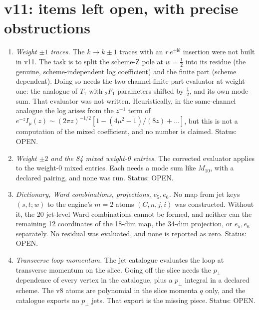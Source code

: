 \documentclass[11pt,a4paper]{article}
\newcommand{\ii}{\mathrm i}
\newcommand{\OPEN}{\textsf{OPEN}}
\theoremstyle{plain}
\theoremstyle{definition}
\theoremstyle{remark}
\numberwithin{equation}{section}
\begin{document}
\section{v11: items left open, with precise obstructions}
\label{sec:v11open}

\begin{enumerate}[label=(\alph*)]
\item \emph{Weight \(\pm1\) traces.} The \(k\to k\pm1\) traces with an
\(r\,e^{\pm\ii\theta}\) insertion were not built in v11. The task is
to split the scheme-Z pole at \(w=\tfrac12\) into its residue (the
genuine, scheme-independent log coefficient) and the finite part
(scheme dependent). Doing so needs the two-channel finite-part
evaluator at weight one: the analogue of \(T_1\) with
\({}_2F_1\) parameters shifted by \(\tfrac12\), and its own mode sum.
That evaluator was not written. Heuristically, in the same-channel
analogue the log arises from the \(z^{-1}\) term of
\(e^{-z}I_\mu(z)\sim(2\pi z)^{-1/2}[1-(4\mu^2-1)/(8z)+\dots]\), but
this is not a computation of the mixed coefficient, and no number is
claimed. Status: \OPEN.
\item \emph{Weight \(\pm2\) and the 84 mixed weight-0 entries.} The
corrected evaluator applies to the weight-0 mixed entries. Each
needs a mode sum like \(M_{10}\), with a declared pairing, and none
was run. Status: \OPEN.
\item \emph{Dictionary, Ward combinations, projections, \(e_5,e_6\).}
No map from jet keys \((s,t;w)\) to the engine's \(m=2\) atoms
\((C,n,j,i)\) was constructed. Without it, the 20 jet-level Ward
combinations cannot be formed, and neither can the remaining 12
coordinates of the 18-dim map, the 34-dim projection, or \(e_5,e_6\)
separately. No residual was evaluated, and none is reported as zero.
Status: \OPEN.
\item \emph{Transverse loop momentum.} The jet catalogue evaluates the
loop at transverse momentum on the slice. Going off the slice needs
the \(p_\perp\) dependence of every vertex in the catalogue, plus a
\(p_\perp\) integral in a declared scheme. The v8 atoms are
polynomial in the slice momenta \(q\) only, and the catalogue
exports no \(p_\perp\) jets. That export is the missing piece.
Status: \OPEN.
\end{enumerate}

\end{document}
